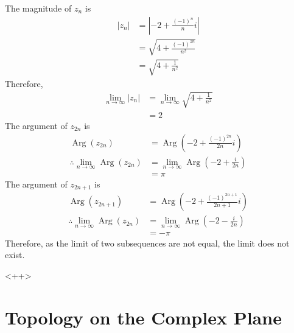 \documentclass[titlepage, fleqn, a4paper, 12pt, twoside]{article}
\theoremstyle{definition}
\theoremstyle{theorem}
\DeclareMathOperator{\Arg}{Arg}
\begin{document}
\begin{solution}
	The magnitude of $z_n$ is
	\begin{align*}
		|z_n| & = \left| -2 + \frac{(-1)^n}{n} i \right| \\
                      & = \sqrt{4 + \frac{(-1)^{2 n}}{n^2}}      \\
                      & = \sqrt{4 + \frac{1}{n^2}}
	\end{align*}
	Therefore,
	\begin{align*}
		\lim\limits_{n \to \infty} |z_n| & = \lim\limits_{n \to \infty} \sqrt{4 + \frac{1}{n^2}} \\
                                                 & = 2
	\end{align*}
	The argument of $z_{2 n}$ is
	\begin{align*}
		\Arg(z_{2 n})                                       & = \Arg\left( -2 + \frac{(-1)^{2 n}}{2 n} i \right)                 \\
		\therefore \lim\limits_{n \to \infty} \Arg(z_{2 n}) & = \lim\limits_{n \to \infty} \Arg\left( -2 + \frac{i}{2 n} \right) \\
                                                                    & = \pi
	\end{align*}
	The argument of $z_{2 n + 1}$ is
	\begin{align*}
		\Arg(z_{2 n + 1})                                   & = \Arg\left( -2 + \frac{(-1)^{2 n + 1}}{2 n + 1} i \right)         \\
		\therefore \lim\limits_{n \to \infty} \Arg(z_{2 n}) & = \lim\limits_{n \to \infty} \Arg\left( -2 - \frac{i}{2 n} \right) \\
                                                                    & = -\pi
	\end{align*}
	Therefore, as the limit of two subsequences are not equal, the limit does not exist.
\end{solution}<++>

\newpage
\part{Topology on the Complex Plane}
\end{document}
